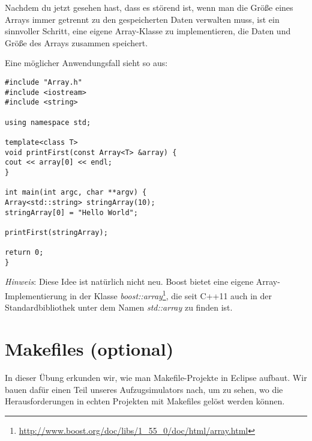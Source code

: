 \documentclass[
  accentcolor=tud1c,	%
  colorbacktitle,		%
  inverttitle,			%
  german,				%
  twoside
]{tudexercise}
\begin{document}
Nachdem du jetzt gesehen hast, dass es störend ist, wenn man die Größe eines Arrays immer getrennt zu den gespeicherten Daten verwalten muss, ist ein sinnvoller Schritt, eine eigene Array-Klasse zu implementieren, die Daten und Größe des Arrays zusammen speichert.

Eine möglicher Anwendungsfall sieht so aus:

\begin{lstlisting}
#include "Array.h"
#include <iostream>
#include <string>

using namespace std;

template<class T>
void printFirst(const Array<T> &array) {
cout << array[0] << endl;
}

int main(int argc, char **argv) {
Array<std::string> stringArray(10);
stringArray[0] = "Hello World";

printFirst(stringArray);

return 0;
}
\end{lstlisting}

\emph{Hinweis}:
Diese Idee ist natürlich nicht neu.
Boost bietet eine eigene Array-Implementierung in der Klasse \emph{boost::array}\footnote{\url{http://www.boost.org/doc/libs/1_55_0/doc/html/array.html}}, die seit C++11 auch in der Standardbibliothek unter dem Namen \emph{std::array} zu finden ist.



\section{Makefiles (optional)}

In dieser Übung erkunden wir, wie man Makefile-Projekte in Eclipse aufbaut.
Wir bauen dafür einen Teil unseres Aufzugsimulators nach, um zu sehen, wo die Herausforderungen in echten Projekten mit Makefiles gelöst werden können.
\end{document}
